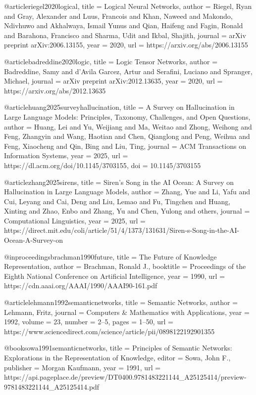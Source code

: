 @article{riegel2020logical,
  title   = {Logical Neural Networks},
  author  = {Riegel, Ryan and Gray, Alexander and Luus, Francois and Khan, Naweed and Makondo, Ndivhuwo and Akhalwaya, Ismail Yunus and Qian, Haifeng and Fagin, Ronald and Barahona, Francisco and Sharma, Udit and Ikbal, Shajith},
  journal = {arXiv preprint arXiv:2006.13155},
  year    = {2020},
  url     = {https://arxiv.org/abs/2006.13155}
}

@article{badreddine2020logic,
  title   = {Logic Tensor Networks},
  author  = {Badreddine, Samy and d'Avila Garcez, Artur and Serafini, Luciano and Spranger, Michael},
  journal = {arXiv preprint arXiv:2012.13635},
  year    = {2020},
  url     = {https://arxiv.org/abs/2012.13635}
}

@article{huang2025surveyhallucination,
  title   = {A Survey on Hallucination in Large Language Models: Principles, Taxonomy, Challenges, and Open Questions},
  author  = {Huang, Lei and Yu, Weijiang and Ma, Weitao and Zhong, Weihong and Feng, Zhangyin and Wang, Haotian and Chen, Qianglong and Peng, Weihua and Feng, Xiaocheng and Qin, Bing and Liu, Ting},
  journal = {ACM Transactions on Information Systems},
  year    = {2025},
  url     = {https://dl.acm.org/doi/10.1145/3703155},
  doi     = {10.1145/3703155}
}

@article{zhang2025sirens,
  title   = {Siren's Song in the AI Ocean: A Survey on Hallucination in Large Language Models},
  author  = {Zhang, Yue and Li, Yafu and Cui, Leyang and Cai, Deng and Liu, Lemao and Fu, Tingchen and Huang, Xinting and Zhao, Enbo and Zhang, Yu and Chen, Yulong and others},
  journal = {Computational Linguistics},
  year    = {2025},
  url     = {https://direct.mit.edu/coli/article/51/4/1373/131631/Siren-s-Song-in-the-AI-Ocean-A-Survey-on}
}

@inproceedings{brachman1990future,
  title     = {The Future of Knowledge Representation},
  author    = {Brachman, Ronald J.},
  booktitle = {Proceedings of the Eighth National Conference on Artificial Intelligence},
  year      = {1990},
  url       = {https://cdn.aaai.org/AAAI/1990/AAAI90-161.pdf}
}

@article{lehmann1992semanticnetworks,
  title   = {Semantic Networks},
  author  = {Lehmann, Fritz},
  journal = {Computers \& Mathematics with Applications},
  year    = {1992},
  volume  = {23},
  number  = {2--5},
  pages   = {1--50},
  url     = {https://www.sciencedirect.com/science/article/pii/0898122192901355}
}

@book{sowa1991semanticnetworks,
  title     = {Principles of Semantic Networks: Explorations in the Representation of Knowledge},
  editor    = {Sowa, John F.},
  publisher = {Morgan Kaufmann},
  year      = {1991},
  url       = {https://api.pageplace.de/preview/DT0400.9781483221144_A25125414/preview-9781483221144_A25125414.pdf}
}

